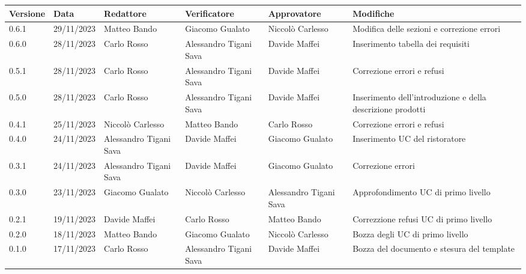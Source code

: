 \begin{table}[H]
	\centering
	\fontsize{10}{12}\selectfont
	\begin{tabularx}{\textwidth}{X|X|X|X|X|X}
		\textbf{Versione}     & \textbf{Data}        & \textbf{Redattore}     &
		\textbf{Verificatore} & \textbf{Approvatore} & \textbf{Modifiche}                                                                                                    \\
		\toprule
		0.6.1                 & 29/11/2023           & Matteo Bando           & Giacomo Gualato        & Niccolò Carlesso       & Modifica delle sezioni e correzione errori                 \\
		\hline
		0.6.0                 & 28/11/2023           & Carlo Rosso            & Alessandro Tigani Sava & Davide Maffei          & Inserimento tabella dei requisiti                          \\
		\hline
		0.5.1                 & 28/11/2023           & Carlo Rosso            & Alessandro Tigani Sava & Davide Maffei          & Correzione errori e refusi                                 \\
		\hline
		0.5.0                 & 28/11/2023           & Carlo Rosso            & Alessandro Tigani Sava & Davide Maffei          & Inserimento dell'introduzione e della descrizione prodotti \\
		\hline
		0.4.1                 & 25/11/2023           & Niccolò Carlesso       & Matteo Bando           & Carlo Rosso            & Correzione errori e refusi                 \\
		\hline
		0.4.0                 & 24/11/2023           & Alessandro Tigani Sava & Davide Maffei          & Giacomo Gualato        & Inserimento UC del ristoratore             \\
		\hline
		0.3.1                 & 24/11/2023           & Alessandro Tigani Sava & Davide Maffei          & Giacomo Gualato        & Correzione errori                          \\
		\hline
		0.3.0                 & 23/11/2023           & Giacomo Gualato        & Niccolò Carlesso       & Alessandro Tigani Sava & Approfondimento UC di primo livello        \\
		\hline
		0.2.1                 & 19/11/2023           & Davide Maffei          & Carlo Rosso            & Matteo Bando           & Correzzione refusi UC di primo livello     \\
		\hline
		0.2.0                 & 18/11/2023           & Matteo Bando           & Giacomo Gualato        & Niccolò Carlesso       & Bozza degli UC di primo livello            \\
		\hline
		0.1.0                 & 17/11/2023           & Carlo Rosso            & Alessandro Tigani Sava & Davide Maffei          & Bozza del documento e stesura del template \\
		\bottomrule
	\end{tabularx}
\end{table}